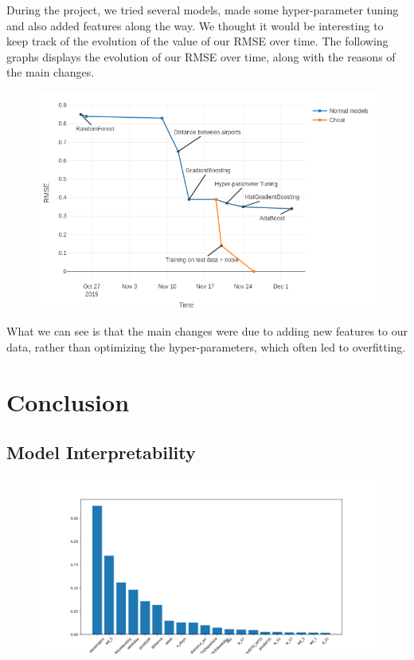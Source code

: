 \documentclass[a4paper,12pt,twoside]{article}
\begin{document}
During the project, we tried several models, made some hyper-parameter tuning and also added features along the way. We thought it would be interesting to keep track of the evolution of the value of our RMSE over time.
The following graphs displays the evolution of our RMSE over time, along with the reasons of the main changes.

\begin{figure}[H]
	\centering
	\includegraphics[scale=0.4]{rmse_evolution.png}
\end{figure}

What we can see is that the main changes were due to adding new features to our data, rather than optimizing the hyper-parameters, which often led to overfitting.

\section{Conclusion}

\subsection{Model Interpretability}

\begin{figure}[H]
	\centering
	\includegraphics[scale=0.4]{feature_importance.png}
\end{figure}
\end{document}
